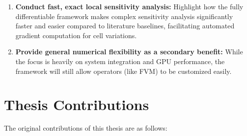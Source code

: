 \begin{enumerate}
  \item \textbf{Conduct fast, exact local sensitivity analysis:} Highlight how the fully differentiable framework makes complex sensitivity analysis significantly faster and easier compared to literature baselines, facilitating automated gradient computation for cell variations.
  
  \item \textbf{Provide general numerical flexibility as a secondary benefit:} While the focus is heavily on system integration and GPU performance, the framework will still allow operators (like FVM) to be customized easily.
\end{enumerate}

\section{Thesis Contributions}
\label{sec:contributions}

The original contributions of this thesis are as follows:

